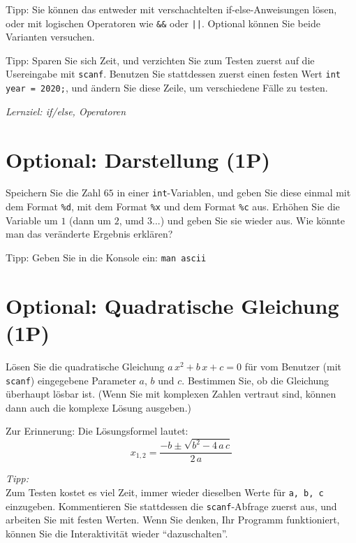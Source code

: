 \documentclass[
	ngerman,
	fontsize=10pt,
	parskip=half,
	titlepage=true,
	DIV=12
]{scrartcl}
\newcommand*{\inC}[1]{\texttt{#1}}
\begin{document}
Tipp: Sie können das entweder mit verschachtelten if-else-Anweisungen lösen,
oder mit logischen Operatoren wie \texttt{\&\&} oder \texttt{||}.
Optional können Sie beide Varianten versuchen.

Tipp: Sparen Sie sich Zeit, und verzichten Sie zum Testen zuerst auf die Usereingabe mit \inC{scanf}. Benutzen Sie stattdessen zuerst einen festen Wert \inC{int year = 2020;}, und ändern Sie diese Zeile, um verschiedene Fälle zu testen.

\emph{Lernziel: if/else, Operatoren}


\section{Optional: Darstellung (1P)}
Speichern Sie die Zahl $65$ in einer \inC{int}-Variablen, und geben Sie diese einmal mit dem Format \texttt{\%d}, mit dem Format \texttt{\%x} und dem Format \texttt{\%c} aus.
Erhöhen Sie die Variable um $1$ (dann um $2$, umd $3$...) und geben Sie sie wieder aus. Wie könnte man das veränderte Ergebnis erklären?

Tipp: Geben Sie in die Konsole ein: \texttt{man ascii}


\section{Optional: Quadratische Gleichung (1P)}
Lösen Sie die quadratische Gleichung $a\,x^2+b\,x+c=0$ für vom Benutzer (mit \texttt{scanf}) eingegebene Parameter $a$, $b$ und $c$.
Bestimmen Sie, ob die Gleichung überhaupt lösbar ist. (Wenn Sie mit komplexen Zahlen vertraut sind, können dann auch die komplexe Lösung ausgeben.)

Zur Erinnerung: Die Lösungsformel lautet:
\[x_{1,2} = \frac{-b \pm \sqrt{b^2 - 4\,a\,c}}{2\,a}\]

\emph{Tipp:}\\
Zum Testen kostet es viel Zeit, immer wieder dieselben Werte für \texttt{a, b, c} einzugeben. Kommentieren Sie stattdessen die \texttt{scanf}-Abfrage zuerst aus, und arbeiten Sie mit festen Werten. Wenn Sie denken, Ihr Programm funktioniert, können Sie die Interaktivität wieder \enquote{dazuschalten}.
\end{document}
